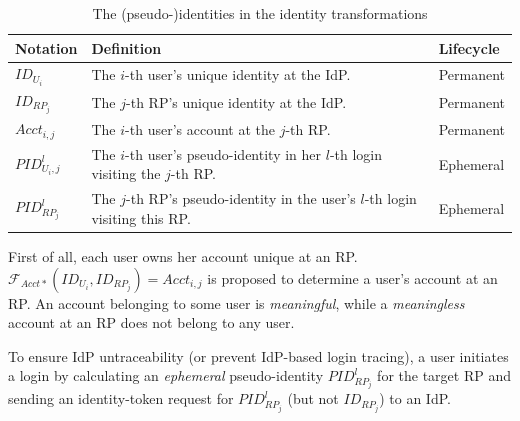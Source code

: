 \begin{table}[t]
\footnotesize
    \caption{The (pseudo-)identities in the identity transformations}
    \centering
    \begin{tabular}{|l|p{5.15cm}|l|} \hline
    {\textbf{Notation}} & {\textbf{Definition}} & {\textbf{Lifecycle}} \\ \hline
    {$ID_{U_i}$} & {The $i$-th user's unique identity at the IdP.} & {Permanent} \\ \hline
    {$ID_{RP_j}$} & {The $j$-th RP's unique identity at the IdP.} & {Permanent} \\ \hline
    {$Acct_{i,j}$} & {The $i$-th user's account at the $j$-th RP.} & {Permanent} \\ \hline
    {$PID_{U_i,j}^l$} & {The $i$-th user's pseudo-identity in her $l$-th login visiting the $j$-th RP.} & {Ephemeral} \\ \hline
    {$PID_{RP_j}^l$} & {The $j$-th RP's pseudo-identity in the user's $l$-th login visiting this RP.} & {Ephemeral} \\ \hline
    \end{tabular}
    \label{tbl:notations-dilemma}
\end{table}





First of all, each user owns her account unique at an RP.
$\mathcal{F}_{Acct\ast}(ID_{U_i}, ID_{RP_j}) = Acct_{i,j}$ is proposed to determine a user's account at an RP.
An account belonging to some user is \emph{meaningful},
while a \emph{meaningless} account at an RP does not belong to any user.

To ensure IdP untraceability (or prevent IdP-based login tracing),
    a user initiates a login by calculating an \emph{ephemeral} pseudo-identity $PID^l_{RP_j}$  for the target RP and sending an identity-token request for $PID^l_{RP_j}$ (but not $ID_{RP_j}$) to an IdP.

